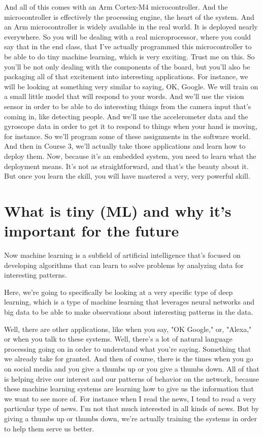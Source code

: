 And all of this comes with an Arm Cortex-M4 microcontroller.
And the microcontroller is effectively the processing engine, the heart of the system.
And an Arm microcontroller is widely available in the real world.
It is deployed nearly everywhere.
So you will be dealing with a real microprocessor, where you could say that in the end class, that I've actually programmed this microcontroller to be able to do tiny machine learning, which is very exciting.
Trust me on this.
So you'll be not only dealing with the components of the board, but you'll also be packaging all of that excitement
into interesting applications.
For instance, we will be looking at something very similar to saying, OK, Google.
We will train on a small little model that will respond to your words.
And we'll use the vision sensor in order to be able to do interesting things from the camera input that's coming in, like detecting people.
And we'll use the accelerometer data and the gyroscope data in order to get it to respond to things when your hand is moving, for instance.
So we'll program some of these assignments in the software world.
And then in Course 3, we'll actually take those applications and learn how to deploy them.
Now, because it's an embedded system, you need to learn what the deployment means.
It's not as straightforward, and that's the beauty about it.
But once you learn the skill, you will have mastered a very, very powerful skill.






\section{What is tiny (ML) and why it's important for the future}


Now machine learning is a subfield of artificial intelligence that's focused on developing algorithms that can learn to solve problems by analyzing data for interesting patterns.

Here, we're going to specifically be looking at a very specific type of deep learning, which is a type of machine learning that leverages neural networks and big data to be able to make observations about interesting patterns in the data.


Well, there are other applications, like when you say, "OK Google," or, "Alexa," or when you talk to these systems.
Well, there's a lot of natural language processing going on in order to understand what you're saying.
Something that we already take for granted.
And then of course, there is the times when you go on social media and you give a thumbs up or you give a thumbs down.
All of that is helping drive our interest and our patterns of behavior on the network, because these machine learning systems are learning how to give us the information that we want to see more of.
For instance when I read the news, I tend to read a very particular type of news.
I'm not that much interested in all kinds of news.
But by giving a thumbs up or thumbs down, we're actually training the systems in order to help them serve us better.

